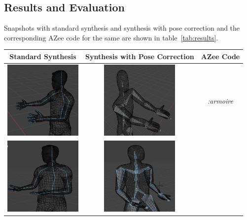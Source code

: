 \documentclass[../../main.tex]{subfiles}
\begin{document}
\subsection{Results and Evaluation}
\label{ch:pose_correction:pose_correction_with_azee:results}

Snapshots with standard synthesis and synthesis with pose correction and the corresponding AZee code for the same are shown in table~\ref{tab:results}.

\begin{table}
  \centering
  \begin{tabular}{|c|c|c|}
    \hline
    \textbf{Standard Synthesis} & \textbf{Synthesis with Pose Correction} & \textbf{AZee Code} \\
    \hline
    \includegraphics[width = 1.5in]{chapters/pose_correction/images/standard_synthesis_armoire.png} & \includegraphics[width = 1.5in]{chapters/pose_correction/images/pose_correction_synthesis_armoire.png} & 
      \emph{:armoire} \\
    \hline
    \includegraphics[width = 1.5in]{chapters/pose_correction/images/standard_synthesis_maintenant.png} & \includegraphics[width = 1.5in]{chapters/pose_correction/images/pose_correction_synthesis_maintenant.png} &

\end{tabular}
\end{table}
\end{document}
